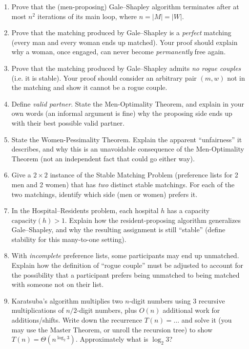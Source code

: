 \documentclass[11pt]{article}
\begin{document}
\begin{enumerate}[label=\textbf{A\arabic*.}, leftmargin=2.2em]
\item Prove that the (men-proposing) Gale--Shapley algorithm terminates after at most
$n^2$ iterations of its main loop, where $n = |M| = |W|$.

\item Prove that the matching produced by Gale--Shapley is a \emph{perfect} matching
(every man and every woman ends up matched). Your proof should explain why a woman, once
engaged, can never become \emph{permanently} free again.

\item Prove that the matching produced by Gale--Shapley admits \emph{no rogue couples}
(i.e. it is stable). Your proof should consider an arbitrary pair $(m,w)$ not in the
matching and show it cannot be a rogue couple.

\item Define \emph{valid partner}. State the Men-Optimality Theorem, and explain in your
own words (an informal argument is fine) why the proposing side ends up with their best
possible valid partner.

\item State the Women-Pessimality Theorem. Explain the apparent ``unfairness'' it
describes, and why this is an unavoidable consequence of the Men-Optimality Theorem (not
an independent fact that could go either way).

\item Give a $2\times 2$ instance of the Stable Matching Problem (preference lists for 2
men and 2 women) that has \emph{two} distinct stable matchings. For each of the two
matchings, identify which side (men or women) prefers it.

\item In the Hospital--Residents problem, each hospital $h$ has a capacity
$\text{capacity}(h) > 1$. Explain how the resident-proposing algorithm generalizes
Gale--Shapley, and why the resulting assignment is still ``stable'' (define stability for
this many-to-one setting).

\item With \emph{incomplete} preference lists, some participants may end up unmatched.
Explain how the definition of ``rogue couple'' must be adjusted to account for the
possibility that a participant prefers being unmatched to being matched with someone not
on their list.

\item Karatsuba's algorithm multiplies two $n$-digit numbers using 3 recursive
multiplications of $n/2$-digit numbers, plus $O(n)$ additional work for additions/shifts.
Write down the recurrence $T(n) = \ldots$ and solve it (you may use the Master Theorem,
or unroll the recursion tree) to show $T(n) = \Theta(n^{\log_2 3})$. Approximately what is
$\log_2 3$?


\end{enumerate}
\end{document}
